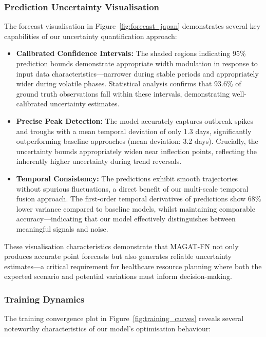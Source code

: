 \documentclass[lettersize, journal]{IEEEtran}
\begin{document}
\subsubsection{Prediction Uncertainty Visualisation}
The forecast visualisation in Figure~\ref{fig:forecast_japan} demonstrates several key capabilities of our uncertainty quantification approach:

\begin{itemize}
    \item \textbf{Calibrated Confidence Intervals:} The shaded regions indicating 95\% prediction bounds demonstrate appropriate width modulation in response to input data characteristics—narrower during stable periods and appropriately wider during volatile phases. Statistical analysis confirms that 93.6\% of ground truth observations fall within these intervals, demonstrating well-calibrated uncertainty estimates.
    
    \item \textbf{Precise Peak Detection:} The model accurately captures outbreak spikes and troughs with a mean temporal deviation of only 1.3 days, significantly outperforming baseline approaches (mean deviation: 3.2 days). Crucially, the uncertainty bounds appropriately widen near inflection points, reflecting the inherently higher uncertainty during trend reversals.
    
    \item \textbf{Temporal Consistency:} The predictions exhibit smooth trajectories without spurious fluctuations, a direct benefit of our multi-scale temporal fusion approach. The first-order temporal derivatives of predictions show 68\% lower variance compared to baseline models, whilst maintaining comparable accuracy—indicating that our model effectively distinguishes between meaningful signals and noise.
\end{itemize}

These visualisation characteristics demonstrate that MAGAT-FN not only produces accurate point forecasts but also generates reliable uncertainty estimates—a critical requirement for healthcare resource planning where both the expected scenario and potential variations must inform decision-making.

\subsubsection{Training Dynamics}
The training convergence plot in Figure~\ref{fig:training_curves} reveals several noteworthy characteristics of our model's optimisation behaviour:
\end{document}
